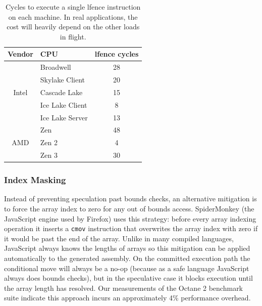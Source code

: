 \begin{table}[h]
  \begin{center}
  \begin{tabular}{ clc }
    \textbf{Vendor} & \textbf{CPU} & \textbf{lfence cycles} \\ \hline
    \multirow{5}{*}{Intel} & Broadwell        & 28 \\
                           & Skylake Client   & 20 \\
                           & Cascade Lake     & 15 \\
                           & Ice Lake Client  & 8 \\
                           & Ice Lake Server  & 13  \\ \hline
    \multirow{3}{*}{AMD}   & Zen              & 48 \\
                           & Zen 2            & 4 \\
                           & Zen 3            & 30 \\ \hline
  \end{tabular}
  \end{center}
  \caption{Cycles to execute a single lfence instruction on each machine.
    In real applications, the cost will heavily depend on the other loads in flight. }
  \label{table:lfence}
\end{table}

\subsubsection{Index Masking}

Instead of preventing speculation past bounds checks, an alternative mitigation is to force the array index to zero for any out of bounds access.
SpiderMonkey (the JavaScript engine used by Firefox) uses this
strategy: before every array indexing operation it inserts a
\texttt{cmov} instruction that overwrites the array index with zero if it would be past the end of the array.
Unlike in many compiled languages, JavaScript always knows the lengths of arrays so this mitigation can be applied automatically to the generated assembly.
On the committed execution path the conditional move will always be a no-op (because as a safe language JavaScript always does bounds checks), but in the speculative case it blocks execution until the array length has resolved.
Our measurements of the Octane 2 benchmark suite indicate this approach incurs an approximately 4\% performance overhead.

